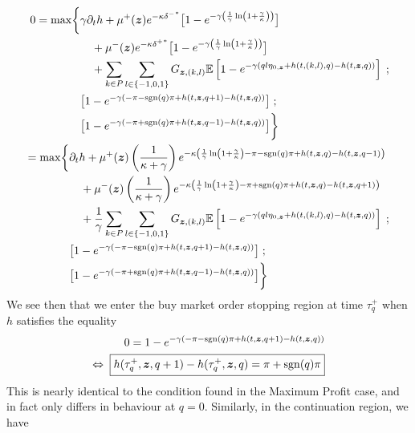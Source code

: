 \begin{align}
\begin{split}
0 = \max \biggl\lbrace & \gamma \partial_t h + \mu^+(\bm{z}) e^{ -\kappa{\delta^-}^*} \bigl[ 1 - e^{-\gamma\left(\frac{1}{\gamma} \ln \left( 1 + \frac{\gamma}{\kappa}\right)\right)} \bigr] \\
& \quad + \mu^-(\bm{z}) e^{ -\kappa {\delta^+}^*} \bigl[ 1 - e^{-\gamma \left( \frac{1}{\gamma} \ln \left( 1 + \frac{\gamma}{\kappa}\right) \right)} \bigr] \\
& \quad + \sum_{k\in P} \sum_{l \in \{-1,0,1\}} G_{\bm{z},(k,l)} \mathbb{E} \left[ 1 - e^{-\gamma(ql\eta_{0,\bm{z}} + h(t,(k,l),q) - h(t,\bm{z},q))} \right] \; ; \\
& \bigl[ 1- e^{-\gamma(-\pi - \operatorname{\mathrm{sgn}}(q)\pi + h(t,\bm{z},q+1) - h(t,\bm{z},q)) } \bigr] \; ; \\
& \bigl[ 1- e^{-\gamma(-\pi + \operatorname{\mathrm{sgn}}(q)\pi + h(t,\bm{z},q-1) - h(t,\bm{z},q)) } \bigr] \biggr\rbrace
\end{split}\\
\begin{split}
\label{eq:PDEcase2}
= \max \biggl\lbrace & \partial_t h + \mu^+(\bm{z}) \left( \frac{1}{\kappa + \gamma} \right) e^{ -\kappa\left( \frac{1}{\gamma} \ln \left( 1 + \frac{\gamma}{\kappa}\right) - \pi - \operatorname{\mathrm{sgn}}(q)\pi + h(t,\bm{z},q) - h(t,\bm{z},q-1) \right)}  \\
& \quad + \mu^-(\bm{z}) \left( \frac{1}{\kappa + \gamma} \right) e^{ -\kappa \left( \frac{1}{\gamma} \ln \left( 1 + \frac{\gamma}{\kappa}\right) - \pi + \operatorname{\mathrm{sgn}}(q)\pi + h(t,\bm{z},q) - h(t,\bm{z},q+1) \right)} \\
& \quad + \frac{1}{\gamma} \sum_{k\in P} \sum_{l \in \{-1,0,1\}} G_{\bm{z},(k,l)} \mathbb{E} \left[ 1 - e^{-\gamma(ql\eta_{0,\bm{z}} + h(t,(k,l),q) - h(t,\bm{z},q))} \right] \; ; \\
& \bigl[ 1- e^{-\gamma(-\pi - \operatorname{\mathrm{sgn}}(q)\pi + h(t,\bm{z},q+1) - h(t,\bm{z},q)) } \bigr] \; ; \\
& \bigl[ 1- e^{-\gamma(-\pi + \operatorname{\mathrm{sgn}}(q)\pi + h(t,\bm{z},q-1) - h(t,\bm{z},q)) } \bigr] \biggr\rbrace
\end{split}
\end{align}
We see then that we enter the buy market order stopping region at time $\tau_q^+$ when $h$ satisfies the equality
\begin{align}
0 = 1- e^{-\gamma(-\pi - \operatorname{\mathrm{sgn}}(q)\pi + h(t,\bm{z},q+1) - h(t,\bm{z},q)) } \\
\label{eq:buyMOfeedbackcase2}
\Leftrightarrow \; \boxed{ h(\tau^+_q, \bm{z}, q+1) - h(\tau^+_q,\bm{z},q) = \pi + \operatorname{\mathrm{sgn}}(q) \pi }
\end{align}
This is nearly identical to the condition found in the Maximum Profit case, and in fact only differs in behaviour at $q=0$. Similarly, in the continuation region, we have
